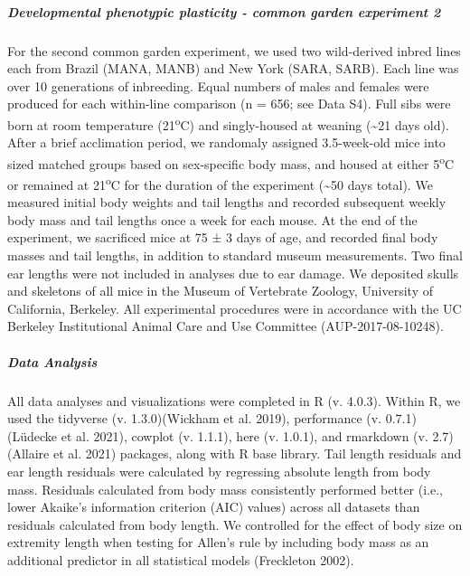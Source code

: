 \documentclass[]{article}
\let\oldsubparagraph\subparagraph
\renewcommand{\subparagraph}[1]{\oldsubparagraph{#1}\mbox{}}
\begin{document}
\vspace{2.5mm}

\hypertarget{developmental-phenotypic-plasticity---common-garden-experiment-2}{%
\subparagraph{\texorpdfstring{\emph{Developmental phenotypic plasticity
- common garden experiment
2}}{Developmental phenotypic plasticity - common garden experiment 2}}\label{developmental-phenotypic-plasticity---common-garden-experiment-2}}

For the second common garden experiment, we used two wild-derived inbred
lines each from Brazil (MANA, MANB) and New York (SARA, SARB). Each line
was over 10 generations of inbreeding. Equal numbers of males and
females were produced for each within-line comparison (n = 656; see Data
S4). Full sibs were born at room temperature (21\textsuperscript{o}C)
and singly-housed at weaning (\textasciitilde{}21 days old). After a
brief acclimation period, we randomaly assigned 3.5-week-old mice into
sized matched groups based on sex-specific body mass, and housed at
either 5\textsuperscript{o}C or remained at 21\textsuperscript{o}C for
the duration of the experiment (\textasciitilde{}50 days total). We
measured initial body weights and tail lengths and recorded subsequent
weekly body mass and tail lengths once a week for each mouse. At the end
of the experiment, we sacrificed mice at 75 ± 3 days of age, and
recorded final body masses and tail lengths, in addition to standard
museum measurements. Two final ear lengths were not included in analyses
due to ear damage. We deposited skulls and skeletons of all mice in the
Museum of Vertebrate Zoology, University of California, Berkeley. All
experimental procedures were in accordance with the UC Berkeley
Institutional Animal Care and Use Committee (AUP-2017-08-10248).

\vspace{2.5mm}

\hypertarget{data-analysis}{%
\subparagraph{\texorpdfstring{\emph{Data
Analysis}}{Data Analysis}}\label{data-analysis}}

All data analyses and visualizations were completed in R (v. 4.0.3).
Within R, we used the tidyverse (v. 1.3.0)(Wickham et al. 2019),
performance (v. 0.7.1)(Lüdecke et al. 2021), cowplot (v. 1.1.1), here
(v. 1.0.1), and rmarkdown (v. 2.7)(Allaire et al. 2021) packages, along
with R base library. Tail length residuals and ear length residuals were
calculated by regressing absolute length from body mass. Residuals
calculated from body mass consistently performed better (i.e., lower
Akaike's information criterion (AIC) values) across all datasets than
residuals calculated from body length. We controlled for the effect of
body size on extremity length when testing for Allen's rule by including
body mass as an additional predictor in all statistical models
(Freckleton 2002).
\end{document}
